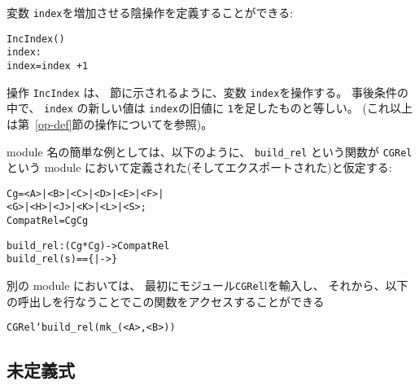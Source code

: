 \documentclass[\pformat,12pt]{jarticle}
\begin{document}
\begin{description}
 変数 {\tt index}を増加させる陰操作を定義することができる:
  \begin{alltt}
    IncIndex()
     index : 
     index = index~ + 1
  \end{alltt}
 操作 {\tt IncIndex} は、 節に示されるように、変数 {\tt index}を操作する。
事後条件の中で、 {\tt index} の新しい値は {\tt index}の旧値に  \texttt{1}を足したものと等しい。
(これ以上は第~\ref{op-def}節の操作についてを参照)。

module 
名の簡単な例としては、以下のように、 \texttt{build\_rel} という関数が \texttt{CGRel} という
module 
において定義された(そしてエクスポートされた)と仮定する:
\begin{alltt}

    Cg = <A> | <B> | <C> | <D> | <E> | <F> | 
         <G> | <H> | <J> | <K> | <L> | <S>;
    CompatRel =  Cg  Cg


    build_rel :  (Cg * Cg) -> CompatRel
    build_rel (s) == \{|->\}
\end{alltt}
別の
module 
においては、
最初にモジュール\texttt{CGRel}lを輸入し、 
それから、以下の呼出しを行なうことでこの関数をアクセスすることができる
  \begin{alltt}
  CGRel`build_rel({mk_(<A>, <B>)})
  \end{alltt}


\end{description}

\subsection{未定義式}
\end{document}
